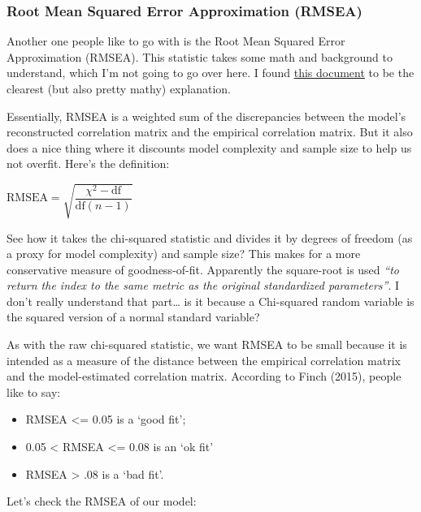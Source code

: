 \documentclass[
  letterpaper,
  DIV=11,
  numbers=noendperiod]{scrreprt}
\begin{document}
\hypertarget{root-mean-squared-error-approximation-rmsea}{%
\subsubsection{Root Mean Squared Error Approximation
(RMSEA)}\label{root-mean-squared-error-approximation-rmsea}}

Another one people like to go with is the Root Mean Squared Error
Approximation (RMSEA). This statistic takes some math and background to
understand, which I'm not going to go over here. I found
\href{http://www.statpower.net/Content/312/Handout/Measures\%20of\%20Fit\%20in\%20Structural\%20Equation\%20Modeling.pdf}{this
document} to be the clearest (but also pretty mathy) explanation.

Essentially, RMSEA is a weighted sum of the discrepancies between the
model's reconstructed correlation matrix and the empirical correlation
matrix. But it also does a nice thing where it discounts model
complexity and sample size to help us not overfit. Here's the
definition:

\(\text{RMSEA} = \sqrt{\dfrac{χ^2 - \text{df}}{\text{df}(n-1)}}\)

See how it takes the chi-squared statistic and divides it by degrees of
freedom (as a proxy for model complexity) and sample size? This makes
for a more conservative measure of goodness-of-fit. Apparently the
square-root is used \emph{``to return the index to the same metric as
the original standardized parameters''}. I don't really understand that
part\ldots{} is it because a Chi-squared random variable is the squared
version of a normal standard variable?

As with the raw chi-squared statistic, we want RMSEA to be small because
it is intended as a measure of the distance between the empirical
correlation matrix and the model-estimated correlation matrix. According
to Finch (2015), people like to say:

\begin{itemize}
\item
  RMSEA \textless= 0.05 is a `good fit';
\item
  0.05 \textless{} RMSEA \textless= 0.08 is an `ok fit'
\item
  RMSEA \textgreater{} .08 is a `bad fit'.
\end{itemize}

Let's check the RMSEA of our model:
\end{document}
